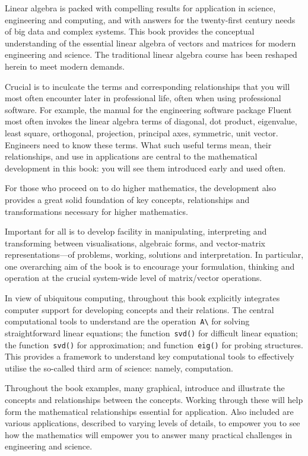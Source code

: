 Linear algebra is packed with compelling results for application in science, engineering and computing, and with answers for the twenty-first century needs of big data and complex systems.
This book provides the conceptual understanding of the essential linear algebra of vectors and matrices for modern engineering and science.
The traditional linear algebra course has been reshaped herein to meet modern demands.

Crucial is to inculcate the terms and corresponding relationships that you will most often encounter later in professional life, often when using professional software.  
For example, the manual for the engineering software package Fluent most often invokes the linear algebra terms of diagonal, dot product, eigenvalue, least square, orthogonal, projection, principal axes, symmetric, unit vector.
Engineers need to know these terms.
What such useful terms mean, their relationships, and use in applications are central to the mathematical development in this book: you will see them introduced early and used often.

For those who proceed on to do higher mathematics, the development also provides a great solid foundation of key concepts, relationships and transformations necessary for higher mathematics. 

Important for all is to develop facility in manipulating, interpreting and transforming between visualisations, algebraic forms, and vector-matrix representations---of problems, working, solutions and interpretation.
In particular, one overarching aim of the book is to encourage your formulation, thinking and operation at the crucial system-wide level of matrix\slash vector operations.

In view of ubiquitous computing, throughout this book explicitly integrates computer support for developing concepts and their relations.
The central computational tools to understand are the operation~\verb|A\| for solving straightforward linear equations; the function~\verb|svd()| for difficult linear equation; the function~\verb|svd()| for approximation; and function~\verb|eig()| for probing structures.
This provides a framework to understand key computational tools to effectively utilise the so-called third arm of science: namely, computation. 

Throughout the book examples, many graphical, introduce and illustrate the concepts and relationships between the concepts.
Working through these will help form the mathematical relationships essential for application.
Also included are various applications, described to varying levels of details, to empower you to see how the mathematics will empower you to answer many practical challenges in engineering and science.


